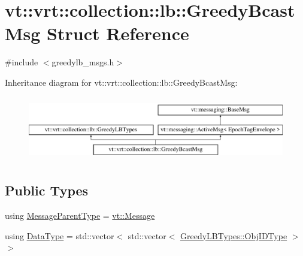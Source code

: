 \hypertarget{structvt_1_1vrt_1_1collection_1_1lb_1_1_greedy_bcast_msg}{}\section{vt\+:\+:vrt\+:\+:collection\+:\+:lb\+:\+:Greedy\+Bcast\+Msg Struct Reference}
\label{structvt_1_1vrt_1_1collection_1_1lb_1_1_greedy_bcast_msg}


{\ttfamily \#include $<$greedylb\+\_\+msgs.\+h$>$}

Inheritance diagram for vt\+:\+:vrt\+:\+:collection\+:\+:lb\+:\+:Greedy\+Bcast\+Msg\+:\begin{figure}[H]
\begin{center}
\leavevmode
\includegraphics[height=2.847458cm]{structvt_1_1vrt_1_1collection_1_1lb_1_1_greedy_bcast_msg}
\end{center}
\end{figure}
\subsection*{Public Types}
\begin{DoxyCompactItemize}
\item 
using \hyperlink{structvt_1_1vrt_1_1collection_1_1lb_1_1_greedy_bcast_msg_aa770154dd178530ce54fc2327e61ef21}{Message\+Parent\+Type} = \hyperlink{namespacevt_a3a3ddfef40b4c90915fa43cdd5f129ea}{vt\+::\+Message}
\item 
using \hyperlink{structvt_1_1vrt_1_1collection_1_1lb_1_1_greedy_bcast_msg_a56f882aadc6658debe93c6523b4e524f}{Data\+Type} = std\+::vector$<$ std\+::vector$<$ \hyperlink{structvt_1_1vrt_1_1collection_1_1lb_1_1_greedy_l_b_types_ae22670acd689e4ff83315fac2e4acb5e}{Greedy\+L\+B\+Types\+::\+Obj\+I\+D\+Type} $>$ $>$
\end{DoxyCompactItemize}
